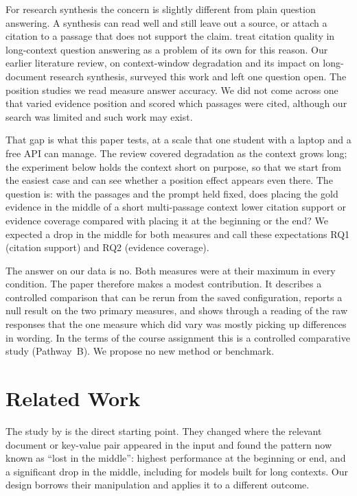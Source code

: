 \documentclass[11pt,a4paper]{article}
\begin{document}
For research synthesis the concern is slightly different from plain question answering.
A synthesis can read well and still leave out a source, or attach a citation to a passage that does not support the claim.
\citet{zhang2025longcite} treat citation quality in long-context question answering as a problem of its own for this reason.
Our earlier literature review, on context-window degradation and its impact on long-document research synthesis,
surveyed this work and left one question open.
The position studies we read measure answer accuracy.
We did not come across one that varied evidence position and scored which passages were cited,
although our search was limited and such work may exist.

That gap is what this paper tests, at a scale that one student with a laptop and a free API can manage.
The review covered degradation as the context grows long; the experiment below holds the context short on purpose,
so that we start from the easiest case and can see whether a position effect appears even there.
The question is:
with the passages and the prompt held fixed, does placing the gold evidence in the middle of a short multi-passage context
lower citation support or evidence coverage compared with placing it at the beginning or the end?
We expected a drop in the middle for both measures and call these expectations RQ1 (citation support) and RQ2 (evidence coverage).

The answer on our data is no.
Both measures were at their maximum in every condition.
The paper therefore makes a modest contribution.
It describes a controlled comparison that can be rerun from the saved configuration,
reports a null result on the two primary measures,
and shows through a reading of the raw responses that the one measure which did vary was mostly picking up differences in wording.
In the terms of the course assignment this is a controlled comparative study (Pathway~B).
We propose no new method or benchmark.

\section{Related Work}
\label{sec:related}

The study by \citet{liu2024lost} is the direct starting point.
They changed where the relevant document or key-value pair appeared in the input and found the pattern now known as ``lost in the middle'':
highest performance at the beginning or end, and a significant drop in the middle, including for models built for long contexts.
Our design borrows their manipulation and applies it to a different outcome.
\end{document}
